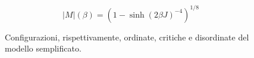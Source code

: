 \documentclass[Lau, noexaminfo, oneside]{sapthesis} %
\begin{document}
\begin{equation}
|M|(\beta) = (1-\sinh(2\beta J)^{-4})^{1/8}
\label{eqonsager}
\end{equation}
\begin{figure}[H]
\hspace{10pt}
\hspace{10pt}
\centering
\caption{Configurazioni, rispettivamente, ordinate, critiche e disordinate del modello semplificato.}
\end{figure}
\end{document}
